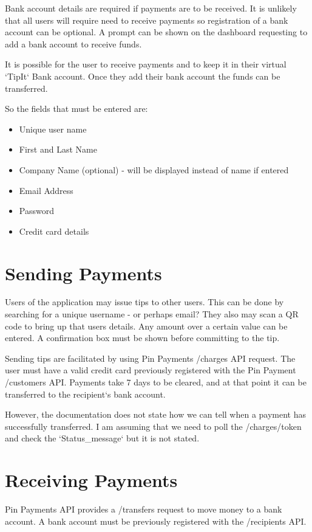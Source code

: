 \documentclass[a4paper, 11pt, oneside]{Thesis}  %
\begin{document}
Bank account details are required if payments are to be received. It is unlikely that all users will require need to receive payments so registration of a bank account can be optional. A prompt can be shown on the dashboard requesting to add a bank account to receive funds.

It is possible for the user to receive payments and to keep it in their virtual `TipIt` Bank account. Once they add their bank account the funds can be transferred.


So the fields that must be entered are:

\begin{itemize}
\item  Unique user name
\item  First and Last Name
\item  Company Name (optional) - will be displayed instead of name if entered
\item  Email Address
\item  Password
\item  Credit card details
\end{itemize}


\section{Sending Payments}

Users of the application may issue tips to other users. This can be done by searching for a unique username - or perhaps email? They also may scan a QR code to bring up that users details. Any amount over a certain value can be entered. A confirmation box must be shown before committing to the tip.


Sending tips are facilitated by using Pin Payments /charges API request. The user must have a valid credit card previously registered with the Pin Payment /customers API. Payments take 7 days to be cleared, and at that point it can be transferred to the recipient`s bank account.

However, the documentation does not state how we can tell when a payment has successfully transferred. I am assuming that we need to poll the /charges/token and check the `Status\_message` but it is not stated.
\section{Receiving Payments}


Pin Payments API provides a /transfers request to move money to a bank account. A bank account must be previously registered with the /recipients API.
\end{document}
